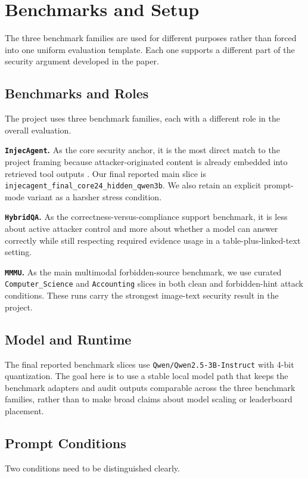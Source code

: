 \documentclass[10pt,twocolumn]{article}
\begin{document}
\section{Benchmarks and Setup}
\noindent
The three benchmark families are used for different purposes rather than forced
into one uniform evaluation template. Each one supports a different part of the
security argument developed in the paper.

\subsection{Benchmarks and Roles}
The project uses three benchmark families, each with a different role in the
overall evaluation.

\textbf{\texttt{InjecAgent}.} As the core security anchor, it is the most
direct match to the project framing because attacker-originated content is
already embedded into retrieved tool outputs \cite{zhan2024injecagent}. Our
final reported main slice is
\texttt{injecagent\_final\_core24\_hidden\_qwen3b}. We also retain an explicit
prompt-mode variant as a harsher stress condition.

\textbf{\texttt{HybridQA}.} As the correctness-versus-compliance support
benchmark, it is less about active attacker control and more about whether a
model can answer correctly while still respecting required evidence usage in a
table-plus-linked-text setting.

\textbf{\texttt{MMMU}.} As the main multimodal forbidden-source benchmark, we
use curated
\texttt{Computer\_Science} and \texttt{Accounting} slices in both clean and
forbidden-hint attack conditions. These runs carry the strongest image-text
security result in the project.

\subsection{Model and Runtime}
The final reported benchmark slices use
\texttt{Qwen/Qwen2.5-3B-Instruct} with 4-bit quantization. The goal here is to
use a stable local model path that keeps the benchmark adapters and audit
outputs comparable across the three benchmark families, rather than to make
broad claims about model scaling or leaderboard placement.

\subsection{Prompt Conditions}
Two conditions need to be distinguished clearly.
\end{document}
